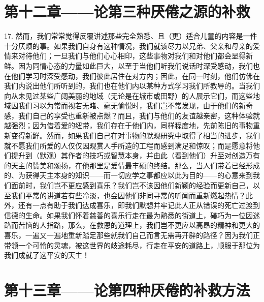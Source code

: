 
\section{第十二章——论第三种厌倦之源的补救}

17. 然而，我们常常觉得反覆讲述那些完全熟悉、且（更）适合儿童的内容是一件十分厌烦的事。如果我们自身有这种情况，我们就该尽力以兄弟、父亲和母亲的爱情来对待他们；一旦我们与他们心心相印，这些事物对我们和对他们都会显得新鲜。因为同情心态的力量如此巨大，以至于当他们听我们说话时深受感动，我们也在他们学习时深受感动，我们彼此居住在对方内；因此，在同一时刻，他们仿佛在我们内说出他们所听到的，我们也在他们内以某种方式学习我们所教导的。当我们向从未见过某些广阔美丽的地域（无论是在城市或田野）的人展示它们，而这些地域因我们习以为常而视若无睹、毫无愉悦时，我们岂不常发现，由于他们的新奇感，我们自己的享受也重新被点燃？而且，我们与他们的友谊越亲密，这种体验就越强烈；因为借着爱的纽带，我们存在于他们内，同样程度地，先前陈旧的事物重新变得新鲜。然而，如果我们自己在对事物的默观研究中取得了相当的进步，我们就不愿我们所爱的人仅仅因观赏人手所造的工程而感到满足和惊叹；而是愿意将他们提升到（默观）其作者的技巧或智慧本身，并由此（看到他们）升至对创造万有的天主的赞美和颂扬，在他那里是爱情最丰硕的终结。那么，当人们带着已经形成的、为获得天主本身的知识——而一切应学之事都应以此为目的——的心意来到我们面前时，我们岂不更应感到喜乐？我们岂不该因他们新颖的经验而更新自己，以至我们平常的讲道若有些冷淡，也会因他们非同寻常的听闻而重新燃起热情？此外，还有一点有助于我们达成喜乐，即我们默想并牢记此人正从错误的死亡过渡到信德的生命。如果我们怀着慈善的喜乐行走在最为熟悉的街道上，碰巧为一位因迷路而苦恼的人指路，那么，在救恩的道理上，我们岂不更应以高昂的精神和更大的喜乐，一遍又一遍地重新踏足那些就我们自己而言无需再开辟的路径？因为我们正带领一个可怜的灵魂，被这世界的歧途耗尽，行走在平安的道路上，顺服于那位为我们成就了这平安的天主！\par


\section{第十三章——论第四种厌倦的补救方法}

